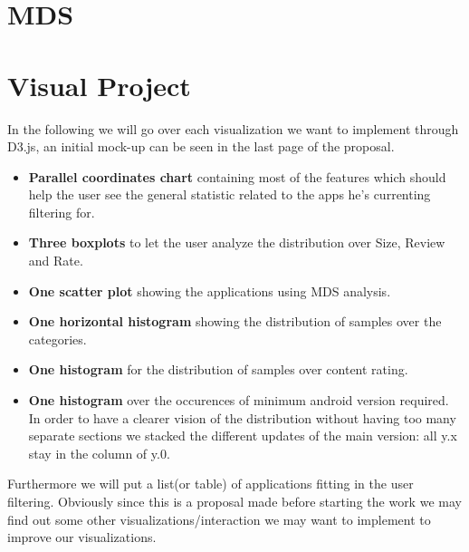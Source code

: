 \documentclass[a4paper, 11pt]{article}
\begin{document}
\section{MDS}

\section{Visual Project}
In the following we will go over each visualization we want to implement through D3.js, an initial mock-up can be seen in the last page of the proposal.
\begin{itemize}
\item \textbf{Parallel coordinates chart} containing most of the features which should help the user see the general statistic related to the apps he's currenting filtering for.
\item \textbf{Three boxplots} to let the user analyze the distribution over Size, Review and Rate.
\item \textbf{One scatter plot} showing the applications using MDS analysis.
\item \textbf{One horizontal histogram} showing the distribution of samples over the categories.
\item \textbf{One histogram} for the distribution of samples over content rating.
\item \textbf{One histogram} over the occurences of minimum android version required. In order to have a clearer vision of the distribution without having too many separate sections we stacked the different updates of the main version: all y.x stay in the column of y.0.
\end{itemize}
Furthermore we will put a list(or table) of applications fitting in the user filtering. Obviously since this is a proposal made before starting the work we may find out some other visualizations/interaction we may want to implement to improve our visualizations.
\end{document}
